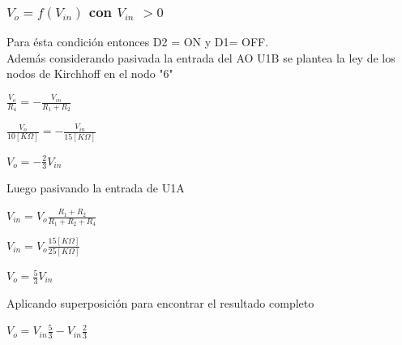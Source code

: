 \documentclass[11pt, a4paper]{article}
\begin{document}
\subsubsection{$V_o = f(V_{in})$ con $V_{in}$ $> 0$  }
Para ésta condición entonces D2 = ON y D1= OFF. \\
Además considerando pasivada la entrada del AO U1B se plantea la ley de los nodos de Kirchhoff en el nodo "6"
\begin{center}
	$\frac{V_o}{R_4} = - \frac{V_{in}}{R_1 + R_2}$
\end{center}
\begin{center}
	$\frac{V_o}{10[K\Omega]} = - \frac{V_{in}}{15[K\Omega]}$
\end{center}
\begin{center}
	$V_o= - \frac{2}{3} V_{in}$
\end{center}
Luego pasivando la entrada de U1A
\begin{center}
	$V_{in}= V_o \frac{R_1 + R_2}{R_1 + R_2 + R_4}$
\end{center}
\begin{center}
	$V_{in}= V_o \frac{15[K\Omega]}{25[K\Omega]}$
\end{center}
\begin{center}
	$V_o = \frac{5}{3} V_{in}$
\end{center}
Aplicando superposición para encontrar el resultado completo
\begin{center}
	$V_o = V_{in} \frac{5}{3} - V_{in} \frac{2}{3}$
\end{center}
\begin{center}
\end{center}
\end{document}
